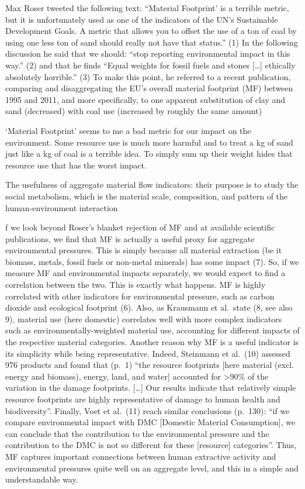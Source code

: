 \documentclass[
]{book}
\begin{document}
Max Roser tweeted the following text: ``Material Footprint' is a terrible metric, but it is unfortunately used as one of the indicators of the UN's Sustainable Development Goals. A metric that allows you to offset the use of a ton of coal by using one less ton of sand should really not have that status.'' (1) In the following discussion he said that we should: ``stop reporting environmental impact in this way.'' (2) and that he finds ``Equal weights for fossil fuels and stones {[}\ldots{]} ethically absolutely horrible.'' (3) To make this point, he referred to a recent publication, comparing and disaggregating the EU's overall material footprint (MF) between 1995 and 2011, and more specifically, to one apparent substitution of clay and sand (decreased) with coal use (increased by roughly the same amount)

`Material Footprint' seems to me a bad metric for our impact on the environment.
Some resource use is much more harmful and to treat a kg of sand just like a kg of coal is a terrible idea.
To simply sum up their weight hides that resource use that has the worst impact.

The usefulness of aggregate material flow indicators: their purpose is to study the social metabolism, which is the material scale, composition, and pattern of the human-environment interaction

f we look beyond Roser's blanket rejection of MF and at available scientific publications, we find that MF is actually a useful proxy for aggregate environmental pressures. This is simply because all material extraction (be it biomass, metals, fossil fuels or non-metal minerals) has some impact (7). So, if we measure MF and environmental impacts separately, we would expect to find a correlation between the two. This is exactly what happens. MF is highly correlated with other indicators for environmental pressure, such as carbon dioxide and ecological footprint (6). Also, as Krausmann et al.~state (8, see also 9), material use (here domestic) correlates well with more complex indicators such as environmentally-weighted material use, accounting for different impacts of the respective material categories. Another reason why MF is a useful indicator is its simplicity while being representative.
Indeed, Steinmann et al.~(10) assessed 976 products and found that (p.~1) ``the resource footprints {[}here material (excl. energy and biomass), energy, land, and water{]} accounted for \textgreater90\% of the variation in the damage footprints. {[}\ldots{]} Our results indicate that relatively simple resource footprints are highly representative of damage to human health and biodiversity''. Finally, Voet et al.~(11) reach similar conclusions (p.~130): ``if we compare environmental impact with DMC {[}Domestic Material Consumption{]}, we can conclude that the contribution to the environmental pressure and the contribution to the DMC is not so different for these {[}resource{]} categories''. Thus, MF captures important connections between human extractive activity and environmental pressures quite well on an aggregate level, and this in a simple and understandable way.
\end{document}

